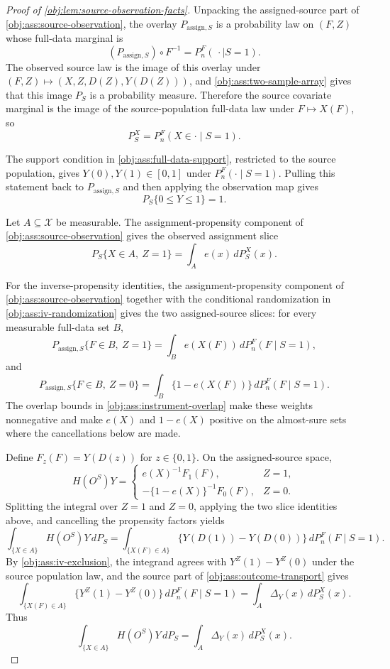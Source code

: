 \documentclass[11pt]{article}
\begin{document}
\begin{proof}[Proof of \cref{obj:lem:source-observation-facts}]
Unpacking the assigned-source part of \cref{obj:ass:source-observation}, the overlay
\(P_{\mathrm{assign},S}\) is a probability law on \((F,Z)\) whose full-data marginal is
\[
(P_{\mathrm{assign},S})\circ F^{-1}
=
P_n^F(\,\cdot\mid S=1).
\]
The observed source law is the image of this overlay under
\((F,Z)\mapsto (X,Z,D(Z),Y(D(Z)))\), and \cref{obj:ass:two-sample-array} gives that this image
\(P_S\) is a probability measure.  Therefore the source covariate marginal is the image of the
source-population full-data law under \(F\mapsto X(F)\), so
\[
P_S^X=P_n^F(X\in\cdot\mid S=1).
\]

The support condition in \cref{obj:ass:full-data-support}, restricted to the source population,
gives \(Y(0),Y(1)\in[0,1]\) under \(P_n^F(\cdot\mid S=1)\).  Pulling this statement back to
\(P_{\mathrm{assign},S}\) and then applying the observation map gives
\[
P_S\{0\le Y\le1\}=1.
\]

Let \(A\subseteq\mathcal X\) be measurable.  The assignment-propensity component of
\cref{obj:ass:source-observation} gives the observed assignment slice
\[
P_S\{X\in A,\ Z=1\}
=
\int_A e(x)\,dP_S^X(x).
\]

For the inverse-propensity identities, the assignment-propensity component of
\cref{obj:ass:source-observation} together with the conditional randomization in
\cref{obj:ass:iv-randomization} gives the two assigned-source slices: for every measurable
full-data set \(B\),
\[
P_{\mathrm{assign},S}\{F\in B,\ Z=1\}
=
\int_B e(X(F))\,dP_n^F(F\mid S=1),
\]
and
\[
P_{\mathrm{assign},S}\{F\in B,\ Z=0\}
=
\int_B \{1-e(X(F))\}\,dP_n^F(F\mid S=1).
\]
The overlap bounds in \cref{obj:ass:instrument-overlap} make these weights nonnegative and make
\(e(X)\) and \(1-e(X)\) positive on the almost-sure sets where the cancellations below are made.

Define \(F_z(F)=Y(D(z))\) for \(z\in\{0,1\}\).  On the assigned-source space,
\[
H(O^S)Y
=
\begin{cases}
e(X)^{-1}F_1(F), & Z=1,\\
-\{1-e(X)\}^{-1}F_0(F), & Z=0.
\end{cases}
\]
Splitting the integral over \(Z=1\) and \(Z=0\), applying the two slice identities above, and
cancelling the propensity factors yields
\[
\int_{\{X\in A\}} H(O^S)Y\,dP_S
=
\int_{\{X(F)\in A\}}\{Y(D(1))-Y(D(0))\}\,dP_n^F(F\mid S=1).
\]
By \cref{obj:ass:iv-exclusion}, the integrand agrees with \(Y^Z(1)-Y^Z(0)\) under the source
population law, and the source part of \cref{obj:ass:outcome-transport} gives
\[
\int_{\{X(F)\in A\}}\{Y^Z(1)-Y^Z(0)\}\,dP_n^F(F\mid S=1)
=
\int_A\Delta_Y(x)\,dP_S^X(x).
\]
Thus
\[
\int_{\{X\in A\}} H(O^S)Y\,dP_S
=
\int_A\Delta_Y(x)\,dP_S^X(x).
\]


\end{proof}
\end{document}

